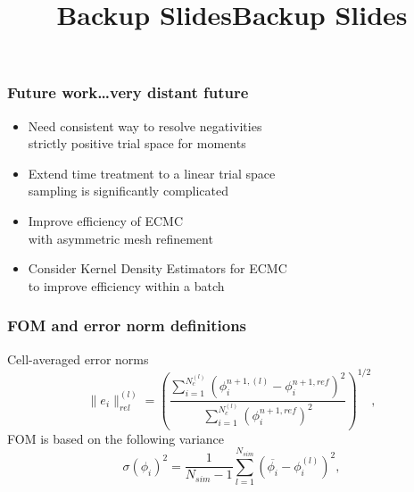 \documentclass[xcolor=dvipsnames,hyperref={pdfpagelabels=false},unknownkeysallowed]{beamer}
\newcommand{\ds}[0]{\displaystyle}
\newcommand{\colG}[1]{{\color{Gray!110} #1}}
\newlength{\wideitemsep}
\let\olditem\item
\renewcommand{\item}{\setlength{\itemsep}{\wideitemsep}\olditem}
\begin{document}
\begin{frame}
    \frametitle{Future work\ldots very distant future}
    \begin{itemize}
        \item[] Need consistent way to resolve negativities
            \\ \colG{strictly positive trial space for moments}
        \item[] Extend time treatment to a linear trial space
            \\ \colG{sampling is significantly complicated}
        \item[] Improve efficiency of ECMC \\ \colG{with asymmetric mesh refinement}
        \item[] Consider Kernel Density Estimators for ECMC \\ \colG{ to improve efficiency within a batch}
    \end{itemize}
\end{frame}

\begin{frame}
    \titlepage \vspace{-0.213in}
    \begin{center}
    \end{center}    
\end{frame}
\appendix
{}
\setcounter{finalframe}{\value{framenumber}}
\date{}
\title{Backup Slides}
\begin{frame}
    \vspace{-0.21in}
    \titlepage \vspace{-0.2113in}
\end{frame}

\title{Backup Slides}
\author{}
\date{}




\begin{frame}
    \frametitle{FOM and error norm definitions}
    Cell-averaged error norms
\begin{equation}
    \|e_i\|^{{(l)}}_{rel} = \left({\frac{\ds \sum\limits_{i=1}^{N^{(l)}_c}
    \left(\phi_i^{n+1,{(l)}} - \phi_i^{n+1,ref}
\right)^2}{\ds \sum\limits_{i=1}^{N^{(l)}_c}\left(\phi_i^{n+1,ref}\right)^2}}\right)^{1/2},
\end{equation}
FOM is based on the following variance
\begin{equation} 
    \sigma(\phi_i)^2 =  \frac{1}{N_{sim}-1} \sum_{l=1}^{N_{sim}} \left(\overline{\phi_{i}} -
    \phi_{i}^{(l)}\right)^2,
\end{equation}
\end{frame}
\end{document}
